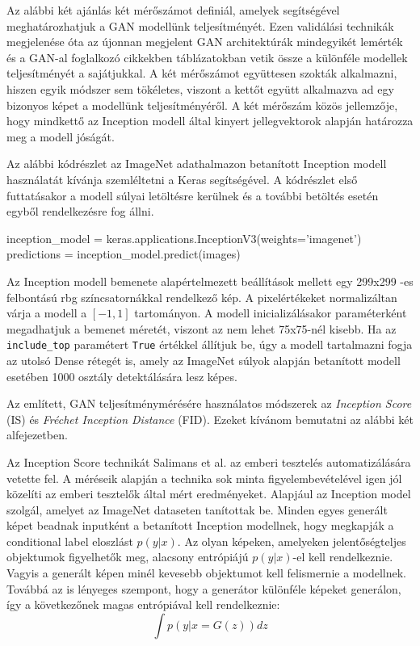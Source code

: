 Az alábbi két ajánlás két mérőszámot definiál, amelyek segítségével meghatározhatjuk a GAN modellünk teljesítményét. Ezen validálási technikák megjelenése óta az újonnan megjelent GAN architektúrák mindegyikét lemérték és a GAN-al foglalkozó cikkekben táblázatokban vetik össze a különféle modellek teljesítményét a sajátjukkal.
A két mérőszámot együttesen szokták alkalmazni, hiszen egyik módszer sem tökéletes, viszont a kettőt együtt alkalmazva ad egy bizonyos képet a modellünk teljesítményéről.
A két mérőszám közös jellemzője, hogy mindkettő az Inception modell által kinyert jellegvektorok alapján határozza meg a modell jóságát.

Az alábbi kódrészlet az ImageNet adathalmazon betanított Inception modell használatát kívánja szemléltetni a Keras segítségével. A kódrészlet első futtatásakor a modell súlyai letöltésre kerülnek és a további betöltés esetén egyből rendelkezésre fog állni.

\begin{python}
inception_model = keras.applications.InceptionV3(weights='imagenet')
predictions = inception_model.predict(images)
\end{python}

Az Inception modell bemenete alapértelmezett beállítások mellett egy 299x299 -es felbontású rbg színcsatornákkal rendelkező kép. A pixelértékeket normalizáltan várja a modell a $[-1, 1]$ tartományon. A modell inicializálásakor paraméterként megadhatjuk a bemenet méretét, viszont az nem lehet 75x75-nél kisebb. Ha az \texttt{include\_top} paramétert \texttt{True} értékkel állítjuk be, úgy a modell tartalmazni fogja az utolsó Dense rétegét is, amely az ImageNet súlyok alapján betanított modell esetében 1000 osztály detektálására lesz képes.

Az említett, GAN teljesítménymérésére használatos módszerek az \textit{Inception Score} (IS) és \textit{Fréchet Inception Distance} (FID). Ezeket kívánom bemutatni az alábbi két alfejezetben.

Az Inception Score \cite{salimans2016improved} technikát Salimans et al. az emberi tesztelés automatizálására vetette fel. A méréseik alapján a technika sok minta figyelembevételével igen jól közelíti az emberi tesztelők által mért eredményeket.
Alapjául az Inception model szolgál, amelyet az ImageNet dataseten tanítottak be. Minden egyes generált képet beadnak inputként a betanított Inception modellnek, hogy megkapják a conditional label eloszlást $p(y|x)$. Az olyan képeken, amelyeken jelentőségteljes objektumok figyelhetők meg, alacsony entrópiájú $p(y|x)$-el kell rendelkeznie. Vagyis a generált képen minél kevesebb objektumot kell felismernie a modellnek.
Továbbá az is lényeges szempont, hogy a generátor különféle képeket generálon, így a következőnek magas entrópiával kell rendelkeznie:
$$ \int p(y|x = G(z))dz $$

